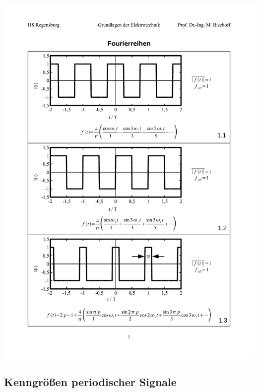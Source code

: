 \includegraphics[page=9,width=\columnwidth]{./Bilder/Fourierreihen_Bischoff_V2}\\


\newpage
\subsection{Kenngrößen periodischer Signale}

